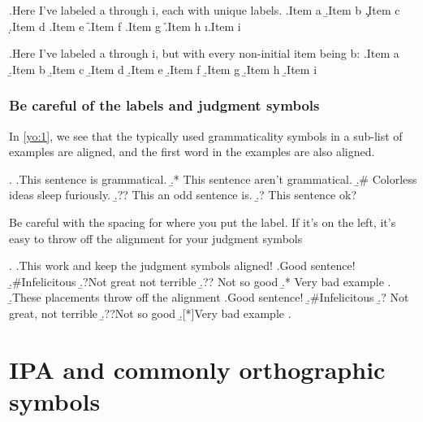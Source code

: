 \documentclass[letterpaper]{article}
\begin{document}
\ex.Here I've labeled a through i, each with unique labels.
    \a.Item a
    \b.Item b
    \c.Item c
    \d.Item d
    \e.Item e
    \f.Item f
    \g.Item g
    \h.Item h
    \i.Item i
    
\ex.Here I've labeled a through i, but with every non-initial item being b:
    \a.Item a
    \b.Item b
    \b.Item c
    \b.Item d
    \b.Item e
    \b.Item f
    \b.Item g
    \b.Item h
    \b.Item i

\subsubsection{Be careful of the labels and judgment symbols}

In \ref{yo:1}, we see that the typically used grammaticality symbols in a sub-list of examples are aligned, and the first word in the examples are also aligned.

\ex.\label{yo:1}
    \a.This sentence is grammatical.
    \b.* This sentence aren't grammatical.
    \b.\# Colorless ideas sleep furiously.
    \b.?? This an odd sentence is.
    \b.? This sentence ok?

Be careful with the spacing for where you put the label.  If it's on the left, it's easy to throw off the alignment for your judgment symbols

\ex.\label{yo:2}
    \a.This work and keep the judgment symbols aligned!
        \a.Good sentence!\label{good:1}%
        \b.\#Infelicitous \label{good:2} %
        \b.?\label{good:3}Not great not terrible %
        \b.?? \label{good:4}Not so good %
        \b.* Very bad\label{good:5} example %
        \z.
    \b.These placements throw off the alignment
        \a.Good sentence!\label{bad:1} %
        \b.\label{bad:2}\#Infelicitous %
        \b.?\label{bad:3} Not great, not terrible %
        \b.{??}Not so good %
        \b.[*]{Very bad example} %
        \z.

\section{IPA and commonly orthographic symbols}
\end{document}
